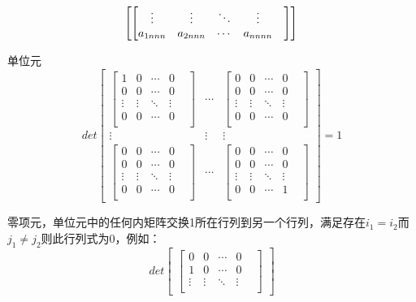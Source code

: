 \documentclass{amsc}          %
\numberwithin{equation}{section} %
\begin{document}
\begin{list}{}
$$\begin{bmatrix}
\begin{bmatrix}
  \vdots&\vdots&\ddots &\vdots& \\
   a_{1nnn}& a_{2nnn}&\cdots&a_{nnnn}\\
   \end{bmatrix}
    \end{bmatrix}\\$$
   \item
   单位元
$$det \begin{bmatrix}
 \begin{bmatrix}
   1& 0&\cdots&0\\
   0& 0&\cdots&0\\
  \vdots&\vdots&\ddots &\vdots& \\
0& 0&\cdots&0\\
\end{bmatrix}&
\cdots&
\begin{bmatrix}
  0& 0&\cdots&0\\
  0& 0&\cdots&0\\
  \vdots&\vdots&\ddots &\vdots& \\
 0& 0&\cdots&0\\
 \end{bmatrix}\\
\vdots&\vdots&\vdots\\
\begin{bmatrix}
  0& 0&\cdots&0\\
  0& 0&\cdots&0\\
  \vdots&\vdots&\ddots &\vdots& \\
   0& 0&\cdots&0\\
   \end{bmatrix}&
\cdots&
\begin{bmatrix}
  0& 0&\cdots&0\\
  0& 0&\cdots&0\\
  \vdots&\vdots&\ddots &\vdots& \\
   0& 0&\cdots&1\\
   \end{bmatrix}
    \end{bmatrix}
    =1$$
      \item
零项元，单位元中的任何内矩阵交换1所在行列到另一个行列，满足存在$i_{1}=i_{2}$而$j_{1}\neq j_{2}$则此行列式为0，例如：
$$det \begin{bmatrix}
 \begin{bmatrix}
   0& 0&\cdots&0\\
   1& 0&\cdots&0\\
  \vdots&\vdots&\ddots &\vdots& \\

\end{bmatrix}
\end{bmatrix}$$
\end{list}
\end{document}
